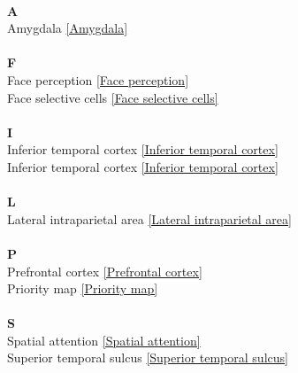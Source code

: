 \textit{}\\[0.2cm]\textbf{A} \\[0.1cm]
Amygdala \ref{Amygdala}\\
\textit{}\\[0.2cm]\textbf{F} \\[0.1cm]
Face perception \ref{Face perception}\\
Face selective cells \ref{Face selective cells}\\
\textit{}\\[0.2cm]\textbf{I} \\[0.1cm]
Inferior temporal cortex \ref{Inferior temporal cortex}\\
Inferior temporal cortex \ref{Inferior temporal cortex}\\
\textit{}\\[0.2cm]\textbf{L} \\[0.1cm]
Lateral intraparietal area \ref{Lateral intraparietal area}\\
\textit{}\\[0.2cm]\textbf{P} \\[0.1cm]
Prefrontal cortex \ref{Prefrontal cortex}\\
Priority map \ref{Priority map}\\
\textit{}\\[0.2cm]\textbf{S} \\[0.1cm]
Spatial attention \ref{Spatial attention}\\
Superior temporal sulcus \ref{Superior temporal sulcus}\\
